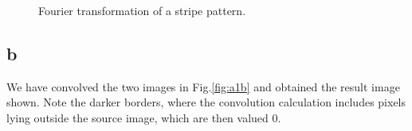 \documentclass[11pt,a4paper]{article}
\begin{document}
\begin{figure}
\quad
{}
\quad

\caption{Fourier transformation of a stripe pattern.}%
\label{fig:a1a}%
\end{figure}

\subsection{b}
We have convolved the two images in Fig.\ref{fig:a1b} and obtained the result image shown. Note the darker borders, where the convolution calculation includes pixels lying outside the source image, which are then valued 0.
\end{document}
